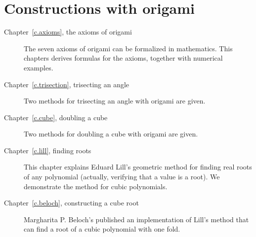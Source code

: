 \section{Constructions with origami}

\begin{description}
\item[Chapter~\ref{c.axioms}, the axioms of origami] The seven axioms of origami can be formalized in mathematics. This chapters derives formulas for the axioms, together with numerical examples.

\item[Chapter~\ref{c.trisection}, trisecting an angle] Two methods for trisecting an angle with origami are given.

\item[Chapter~\ref{c.cube}, doubling a cube] Two methods for doubling a cube with origami are given.

\item[Chapter~\ref{c.lill}, finding roots] This chapter explains Eduard Lill's geometric method for finding real roots of any polynomial (actually, verifying that a value is a root). We demonstrate the method for cubic polynomials.

\item[Chapter~\ref{c.beloch}, constructing a cube root] Margharita P. Beloch's published an implementation of Lill's method that can find a root of a cubic polynomial with one fold.

\end{description}
